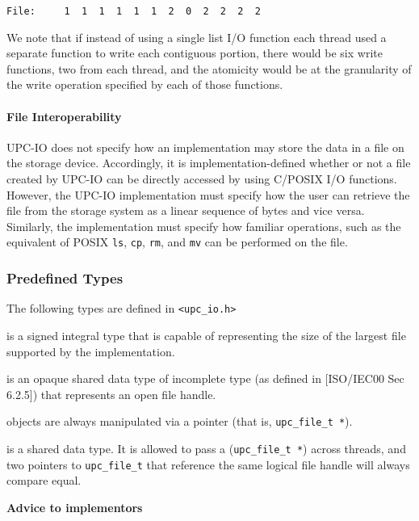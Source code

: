 \begin{verbatim}
File:     1  1  1  1  1  1  2  0  2  2  2  2
\end{verbatim}

\np We note that if instead of using a single list I/O function each thread used
a separate function to write each contiguous portion, there would be six
write functions, two from each thread, and the atomicity would be at the
granularity of the write operation specified by each of those functions.

\paragraph{File Interoperability}

\npf UPC-IO does not specify how an implementation may store the data in a file
on the storage device. Accordingly, it is implementation-defined whether or not 
a file created by UPC-IO can be directly accessed by using C/POSIX I/O functions.
However, the UPC-IO implementation must specify how
the user can retrieve the file from the storage system as a linear sequence
of bytes and vice versa. Similarly, the implementation must specify how
familiar operations, such as the equivalent of POSIX {\tt ls}, {\tt cp}, {\tt rm}, and {\tt mv} can
be performed on the file.

\subsubsection{Predefined Types}

\npf The following types are defined in {\tt <upc\_io.h>}

 is a signed integral type that is capable of representing the size of the largest
file supported by the implementation.

 is an opaque shared data type of incomplete type (as defined in [ISO/IEC00 Sec 6.2.5]) that represents an open file handle.

 objects are always manipulated via a pointer (that is,
{\tt upc\_file\_t *}).

 is a shared data type. It is allowed to pass a ({\tt upc\_file\_t
*}) across threads, and two pointers to {\tt upc\_file\_t} that reference the same
logical file handle will always compare equal.

{\bf Advice to implementors}

